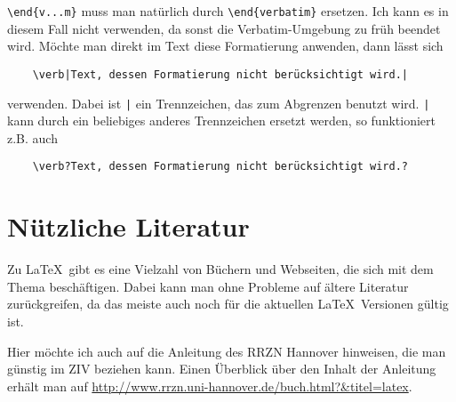 \verb|\end{v...m}| muss man natürlich durch \verb|\end{verbatim}| ersetzen. Ich kann es in diesem Fall nicht verwenden, da sonst die Verbatim-Umgebung zu früh beendet wird. Möchte man direkt im Text diese Formatierung anwenden, dann lässt sich

\begin{verbatim}
    \verb|Text, dessen Formatierung nicht berücksichtigt wird.|
\end{verbatim}

verwenden. Dabei ist \verb+|+ ein Trennzeichen, das zum Abgrenzen benutzt wird. \verb+|+ kann durch ein beliebiges anderes Trennzeichen ersetzt werden, so funktioniert z.B. auch

\begin{verbatim}
    \verb?Text, dessen Formatierung nicht berücksichtigt wird.?
\end{verbatim}

\newpage
\chapter{Nützliche Literatur}

Zu \LaTeX\ gibt es eine Vielzahl von Büchern und Webseiten, die sich mit dem Thema beschäftigen. Dabei kann man ohne Probleme auf ältere Literatur zurückgreifen, da das meiste auch noch für die aktuellen \LaTeX\ Versionen gültig ist.

Hier möchte ich auch auf die Anleitung des RRZN Hannover hinweisen, die man günstig im ZIV beziehen kann. Einen Überblick über den Inhalt der Anleitung erhält man auf \url{http://www.rrzn.uni-hannover.de/buch.html?&titel=latex}.

